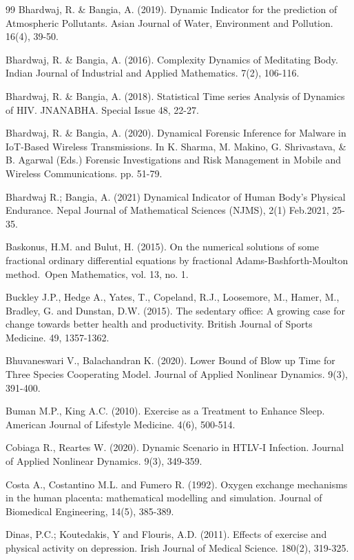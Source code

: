 \documentclass{default}
\begin{document}
\begin{thebibliography}{99}
Bhardwaj, R. \& Bangia, A. (2019). Dynamic Indicator for the prediction of Atmospheric Pollutants. Asian Journal of Water, Environment and Pollution. 16(4), 39-50.

Bhardwaj, R. \& Bangia, A. (2016). Complexity Dynamics of Meditating Body. Indian Journal of Industrial and Applied Mathematics. 7(2), 106-116.

Bhardwaj, R. \& Bangia, A. (2018). Statistical Time series Analysis of Dynamics of HIV. JNANABHA. Special Issue 48, 22-27.

Bhardwaj, R. \& Bangia, A. (2020). Dynamical Forensic Inference for Malware in IoT-Based Wireless Transmissions. In K. Sharma, M. Makino, G. Shrivastava, \& B. Agarwal (Eds.) Forensic Investigations and Risk Management in Mobile and Wireless Communications. pp. 51-79.

Bhardwaj R.; Bangia, A. (2021) Dynamical Indicator of Human Body’s Physical Endurance. Nepal Journal of Mathematical Sciences (NJMS), 2(1) Feb.2021, 25-35.

Baskonus, H.M. and Bulut, H. (2015). On the numerical solutions of some fractional ordinary differential equations by fractional Adams-Bashforth-Moulton method. Open Mathematics, vol. 13, no. 1.

Buckley J.P., Hedge A., Yates, T., Copeland, R.J., Loosemore, M., Hamer, M., Bradley, G. and Dunstan, D.W. (2015). The sedentary office: A growing case for change towards better health and productivity. British Journal of Sports Medicine. 49, 1357-1362.

Bhuvaneswari V., Balachandran K. (2020). Lower Bound of Blow up Time for Three Species Cooperating Model. Journal of Applied Nonlinear Dynamics. 9(3), 391-400.

Buman M.P., King A.C. (2010). Exercise as a Treatment to Enhance Sleep. American Journal of Lifestyle Medicine. 4(6), 500-514.

Cobiaga R., Reartes W. (2020). Dynamic Scenario in HTLV-I Infection. Journal of Applied Nonlinear Dynamics. 9(3), 349-359.

Costa A., Costantino M.L. and Fumero R. (1992). Oxygen exchange mechanisms in the human placenta: mathematical modelling and simulation. Journal of Biomedical Engineering, 14(5), 385-389.

Dinas, P.C.; Koutedakis, Y and Flouris, A.D. (2011). Effects of exercise and physical activity on depression. Irish Journal of Medical Science. 180(2), 319-325.


\end{thebibliography}
\end{document}
